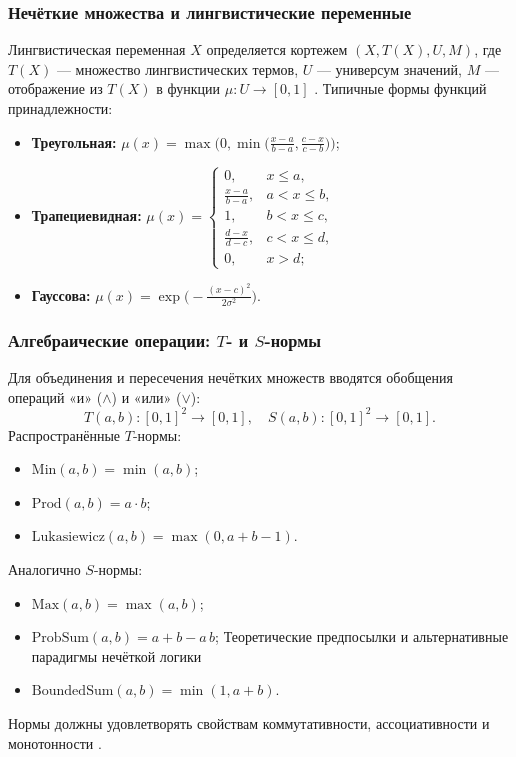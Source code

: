 \subsubsection{Нечёткие множества и лингвистические переменные}
Лингвистическая переменная \(X\) определяется кортежем \((X, T(X), U, M)\), где \(T(X)\) --- множество лингвистических термов, \(U\) --- универсум значений, \(M\) --- отображение из \(T(X)\) в функции \(\mu:U\to[0,1]\) \cite{Zadeh1975}. Типичные формы функций принадлежности:
\begin{itemize}
  \item \textbf{Треугольная:} 
    \(\mu(x) = \max\bigl(0, \min\bigl(\tfrac{x-a}{b-a}, \tfrac{c-x}{c-b}\bigr)\bigr)\);
  \item \textbf{Трапециевидная:}
    \(\mu(x) = \begin{cases}
      0, & x \le a,\\
      \tfrac{x-a}{b-a}, & a < x \le b,\\
      1, & b < x \le c,\\
      \tfrac{d-x}{d-c}, & c < x \le d,\\
      0, & x > d;
    \end{cases}\)
  \item \textbf{Гауссова:}
    \(\mu(x) = \exp\bigl(-\tfrac{(x-c)^2}{2\sigma^2}\bigr)\).
\end{itemize}

\subsubsection{Алгебраические операции: \(T\)- и \(S\)-нормы}
Для объединения и пересечения нечётких множеств вводятся обобщения операций «и» (\(\land\)) и «или» (\(\lor\)):
\[
  T(a,b)\colon [0,1]^2\to[0,1],\quad
  S(a,b)\colon [0,1]^2\to[0,1].
\]
Распространённые \(T\)-нормы:
\begin{itemize}
  \item \(\mathrm{Min}(a,b)=\min(a,b)\);
  \item \(\mathrm{Prod}(a,b)=a\cdot b\);
  \item \(\mathrm{Lukasiewicz}(a,b)=\max(0,a+b-1)\).
\end{itemize}
Аналогично \(S\)-нормы:
\begin{itemize}
  \item \(\mathrm{Max}(a,b)=\max(a,b)\);
  \item \(\mathrm{ProbSum}(a,b)=a+b - a\,b\);
 Теоретические предпосылки и альтернативные
парадигмы нечёткой логики \item \(\mathrm{BoundedSum}(a,b)=\min(1,a+b)\).
\end{itemize}
Нормы должны удовлетворять свойствам коммутативности, ассоциативности и монотонности \cite{Klir1995}.

